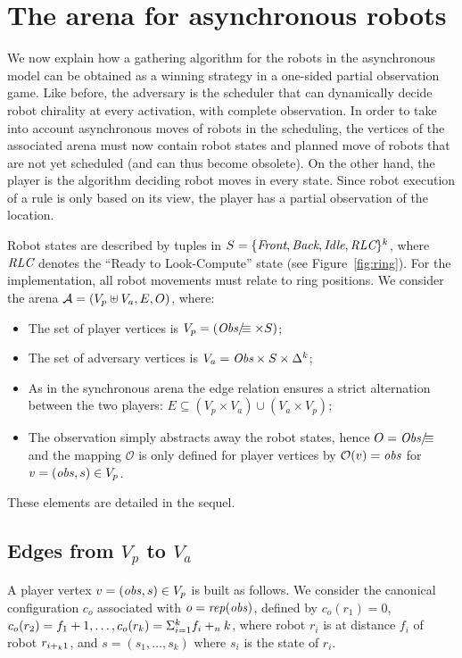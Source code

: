 \section{The arena for asynchronous robots}
\label{sub sub:arenaAsync}
We now explain how a gathering algorithm for the robots in the asynchronous model can be obtained 
as a winning strategy in a one-sided partial observation game. Like before, the adversary is the scheduler that can dynamically 
decide robot chirality at every activation, with complete observation. In order to take into account asynchronous moves of robots 
in the scheduling, the vertices of the associated arena must now contain robot states and planned move of robots that are not yet scheduled 
(and can thus become obsolete).  On the other hand, the player is the algorithm deciding robot moves in every state.
Since robot execution of a rule is only based on its view, the player has a partial observation of the location.

Robot states are described by tuples in $S=\{\textit{Front}, \textit{Back}, \textit{Idle}, \textit{RLC} \}^k$, 
where $\textit{RLC}$ denotes the ``Ready to Look-Compute'' state (see Figure~\ref{fig:ring}). 
For the implementation, all robot movements must relate to ring positions. 
 We consider the arena $\mathcal{A}=(V_p\uplus V_a, E, O)$, where:  
 \begin{itemize}
 \item The set of player vertices is $V_p= (\textit{Obs}/\!\!\!\equiv \times S)$; 
  \item The set of adversary vertices is $V_a= \textit{Obs} \times S \times \Delta^k$; 
 \item  As in the synchronous arena the edge relation ensures a strict alternation between
 the two players:  $E\subseteq (V_p\times V_a) \cup (V_a\times V_p)$;
 \item The observation simply abstracts away the robot states, hence $O= \textit{Obs}/\!\!\!\equiv$ and 
 the mapping $\mathcal{O}$ is only defined for player vertices by $\mathcal{O}(v) = \mathit{obs}$ for 
 $v= (\mathit{obs}, s ) \in V_p$.
 \end{itemize}
 
These elements are detailed in the sequel.
 
\subsection{Edges from $V_p$ to $V_a$}

A player vertex $v= (\mathit{obs}, s) \in V_p$ is built as follows. We consider the canonical configuration $c_o$ 
associated with $o=\mathit{rep}(\mathit{obs})$, defined by $c_o(r_1)=0$, $c_o(r_2)=f_1+1, \dots, c_o(r_k) = \Sigma_{i=1}^k f_i +_n k$, 
where robot $r_i$ is at distance $f_i$ of robot $r_{i +_k 1}$, and $s=(s_1, \ldots, s_k)$ where $s_i$ is the state of $r_i$.

